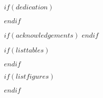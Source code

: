 \documentclass[12pt,final,CPage]{ufthesis} %
\begin{document}






\maketitle
\makecopyright


$if(dedication)$
	\dedication{$dedication$}
$endif$ %


$if(acknowledgements)$
$endif$ %


\tableofcontents %

$if(listtables)$
  \listoftables %
$endif$

$if(listfigures)$
  \listoffigures
$endif$
\end{document}
